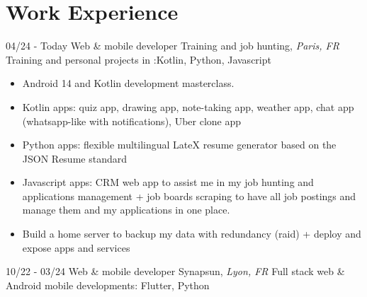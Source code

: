 \documentclass[]{friggeri-cv}
\begin{document}
\section{Work Experience}
\vspace*{-0.25cm}

\begin{entrylist}
  \entry
    {04/24 - Today}
    {Web \& mobile developer}
    {Training and job hunting, \textit{Paris, FR}}
    {Training and personal projects in :\hspace*{8mm}Kotlin, Python, Javascript}
\end{entrylist}
\vspace{-15pt}

\vspace{0.5mm}
\begin{itemize}
\setlength{\itemsep}{1pt}
\setlength{\parskip}{0pt}
\setlength{\parsep}{0pt}

\item Android 14 and Kotlin development masterclass.
\item Kotlin apps: quiz app, drawing app, note-taking app, weather app, chat app (whatsapp-like with notifications), Uber clone app
\item Python apps: flexible multilingual LateX resume generator based on the JSON Resume standard
\item Javascript apps: CRM web app to assist me in my job hunting and applications management + job boards scraping to have all job postings and manage them and my applications in one place.
\item Build a home server to backup my data with redundancy (raid) + deploy and expose apps and services
\end{itemize}

\begin{entrylist}
  \entry
    {10/22 - 03/24}
    {Web \& mobile developer}
    {Synapsun, \textit{Lyon, FR}}
    {Full stack web \& Android mobile developments: \hspace*{8mm}Flutter, Python}
\end{entrylist}
\vspace{-15pt}
\end{document}
